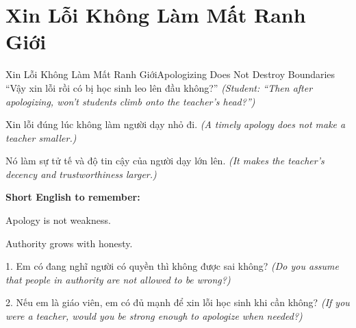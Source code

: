 \section{Xin Lỗi Không Làm Mất Ranh Giới}
\begin{truyen}{Xin Lỗi Không Làm Mất Ranh Giới}{Apologizing Does Not Destroy Boundaries}
 ``Vậy xin lỗi rồi có bị học sinh leo lên đầu không?''
\textit{(Student: ``Then after apologizing, won't students climb onto the teacher's head?'')}

\end{truyen}

\begin{baihoc}
Xin lỗi đúng lúc không làm người dạy nhỏ đi.
\textit{(A timely apology does not make a teacher smaller.)}

Nó làm sự tử tế và độ tin cậy của người dạy lớn lên.
\textit{(It makes the teacher's decency and trustworthiness larger.)}
\end{baihoc}

\begin{ghinhoanh}
\textbf{Short English to remember:}

Apology is not weakness.

Authority grows with honesty.
\end{ghinhoanh}

\begin{tuhocnhanh}
1. Em có đang nghĩ người có quyền thì không được sai không? \textit{(Do you assume that people in authority are not allowed to be wrong?)}

2. Nếu em là giáo viên, em có đủ mạnh để xin lỗi học sinh khi cần không? \textit{(If you were a teacher, would you be strong enough to apologize when needed?)}
\end{tuhocnhanh}

\ngancach